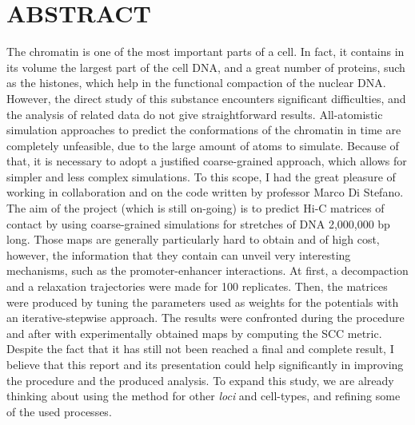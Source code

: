 \graphicspath{{images/}}
\newpage
\section{ABSTRACT}

The chromatin is one of the most important parts of a cell. In fact, it contains in its volume the largest part of the cell DNA, and a great number of proteins, such as the histones, which help in the functional compaction of the nuclear DNA. However, the direct study of this substance encounters significant difficulties, and the analysis of related data do not give straightforward results. All-atomistic simulation approaches to predict the conformations of the chromatin in time are completely unfeasible, due to the large amount of atoms to simulate. Because of that, it is necessary to adopt a justified coarse-grained approach, which allows for simpler and less complex simulations. To this scope, I had the great pleasure of working in collaboration and on the code written by professor Marco Di Stefano. 
The aim of the project (which is still on-going) is to predict Hi-C matrices of contact by using coarse-grained simulations  for stretches of DNA 2,000,000 bp long. Those maps are generally particularly hard to obtain and of high cost, however, the information that they contain can unveil very interesting mechanisms, such as the promoter-enhancer interactions.
At first, a decompaction and a relaxation trajectories were made for 100 replicates. Then, the matrices were produced by tuning the parameters used as weights for the potentials with an iterative-stepwise approach. The results were confronted during the procedure and after with experimentally obtained maps by computing the SCC metric.
Despite the fact that it has still not been reached a final and complete result, I believe that this report and its presentation could help significantly in improving the procedure and the produced analysis.
To expand this study, we are already thinking about using the method for other \textit{loci} and cell-types, and refining some of the used processes.